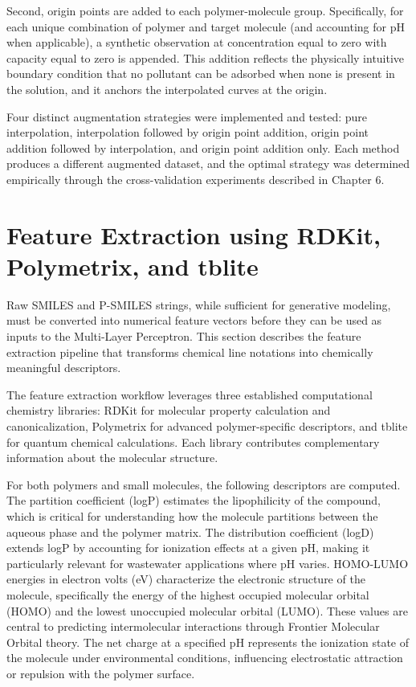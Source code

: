 Second, origin points are added to each polymer-molecule group. Specifically, for each unique combination of polymer and target molecule (and accounting for pH when applicable), a synthetic observation at concentration equal to zero with capacity equal to zero is appended. This addition reflects the physically intuitive boundary condition that no pollutant can be adsorbed when none is present in the solution, and it anchors the interpolated curves at the origin.

Four distinct augmentation strategies were implemented and tested: pure interpolation, interpolation followed by origin point addition, origin point addition followed by interpolation, and origin point addition only. Each method produces a different augmented dataset, and the optimal strategy was determined empirically through the cross-validation experiments described in Chapter 6.

\section{Feature Extraction using RDKit, Polymetrix, and tblite}
\label{sec:feature_extraction}

Raw SMILES and P-SMILES strings, while sufficient for generative modeling, must be converted into numerical feature vectors before they can be used as inputs to the Multi-Layer Perceptron. This section describes the feature extraction pipeline that transforms chemical line notations into chemically meaningful descriptors.

The feature extraction workflow leverages three established computational chemistry libraries: RDKit for molecular property calculation and canonicalization, Polymetrix for advanced polymer-specific descriptors, and tblite for quantum chemical calculations. Each library contributes complementary information about the molecular structure.

For both polymers and small molecules, the following descriptors are computed. The partition coefficient (logP) estimates the lipophilicity of the compound, which is critical for understanding how the molecule partitions between the aqueous phase and the polymer matrix. The distribution coefficient (logD) extends logP by accounting for ionization effects at a given pH, making it particularly relevant for wastewater applications where pH varies. HOMO-LUMO energies in electron volts (eV) characterize the electronic structure of the molecule, specifically the energy of the highest occupied molecular orbital (HOMO) and the lowest unoccupied molecular orbital (LUMO). These values are central to predicting intermolecular interactions through Frontier Molecular Orbital theory. The net charge at a specified pH represents the ionization state of the molecule under environmental conditions, influencing electrostatic attraction or repulsion with the polymer surface.

